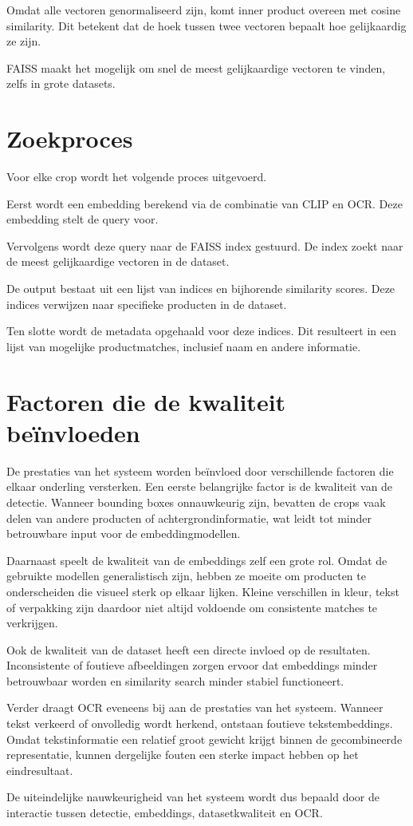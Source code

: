 Omdat alle vectoren genormaliseerd zijn, komt inner product overeen met cosine similarity. Dit betekent dat de hoek tussen twee vectoren bepaalt hoe gelijkaardig ze zijn.

FAISS maakt het mogelijk om snel de meest gelijkaardige vectoren te vinden, zelfs in grote datasets.

\section{Zoekproces}

Voor elke crop wordt het volgende proces uitgevoerd.

Eerst wordt een embedding berekend via de combinatie van CLIP en OCR. Deze embedding stelt de query voor.

Vervolgens wordt deze query naar de FAISS index gestuurd. De index zoekt naar de meest gelijkaardige vectoren in de dataset.

De output bestaat uit een lijst van indices en bijhorende similarity scores. Deze indices verwijzen naar specifieke producten in de dataset.

Ten slotte wordt de metadata opgehaald voor deze indices. Dit resulteert in een lijst van mogelijke productmatches, inclusief naam en andere informatie.

\section{Factoren die de kwaliteit beïnvloeden}
\label{sec:factoren_kwaliteit}

De prestaties van het systeem worden beïnvloed door verschillende factoren die elkaar onderling versterken. Een eerste belangrijke factor is de kwaliteit van de detectie. Wanneer bounding boxes onnauwkeurig zijn, bevatten de crops vaak delen van andere producten of achtergrondinformatie, wat leidt tot minder betrouwbare input voor de embeddingmodellen.

Daarnaast speelt de kwaliteit van de embeddings zelf een grote rol. Omdat de gebruikte modellen generalistisch zijn, hebben ze moeite om producten te onderscheiden die visueel sterk op elkaar lijken. Kleine verschillen in kleur, tekst of verpakking zijn daardoor niet altijd voldoende om consistente matches te verkrijgen.

Ook de kwaliteit van de dataset heeft een directe invloed op de resultaten. Inconsistente of foutieve afbeeldingen zorgen ervoor dat embeddings minder betrouwbaar worden en similarity search minder stabiel functioneert.

Verder draagt OCR eveneens bij aan de prestaties van het systeem. Wanneer tekst verkeerd of onvolledig wordt herkend, ontstaan foutieve tekstembeddings. Omdat tekstinformatie een relatief groot gewicht krijgt binnen de gecombineerde representatie, kunnen dergelijke fouten een sterke impact hebben op het eindresultaat.

De uiteindelijke nauwkeurigheid van het systeem wordt dus bepaald door de interactie tussen detectie, embeddings, datasetkwaliteit en OCR.